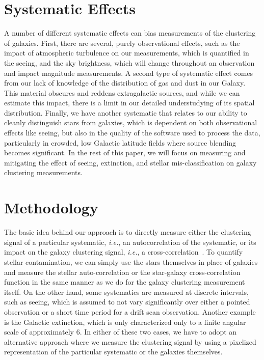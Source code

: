 \section{Systematic Effects}
A number of different systematic effects can bias measurements of the clustering of galaxies. First, there are several, purely observational effects, such as the impact of atmospheric turbulence on our measurements, which is quantified in the seeing, and the sky brightness, which will change throughout an observation and impact magnitude measurements. A second type of systematic effect comes from our lack of knowledge of the distribution of gas and dust in our Galaxy. This material obscures and reddens extragalactic sources, and while we can estimate this impact, there is a limit in our detailed understudying of its spatial distribution. Finally, we have another systematic that relates to our ability to cleanly distinguish stars from galaxies, which is dependent on both observational effects like seeing, but also in the quality of the software used to process the data, particularly in crowded, low Galactic latitude fields where source blending becomes significant. In the rest of this paper, we will focus on measuring and mitigating the effect of seeing, extinction, and stellar mis-classification on galaxy clustering measurements.

\section{Methodology}

The basic idea behind our approach is to directly measure either the clustering signal of a particular systematic, \textit{i.e.}, an autocorrelation of the systematic, or its impact on the galaxy clustering signal, \textit{i.e.}, a cross-correlation~\cite[see, \textit{e.g.},][]{Scranton02}. To quantify stellar contamination, we can simply use the stars themselves in place of galaxies and measure the stellar auto-correlation or the star-galaxy cross-correlation function in the same manner as we do for the galaxy clustering measurement itself. On the other hand, some systematics are measured at discrete intervals, such as seeing, which is assumed to not vary significantly over either a pointed observation or a short time period for a drift scan observation. Another example is the Galactic extinction, which is only characterized only to a finite angular scale of approximately 6\arcmin. In either of these two cases, we have to adopt an alternative approach where we measure the clustering signal by using a pixelized representation of the particular systematic or the galaxies themselves.

